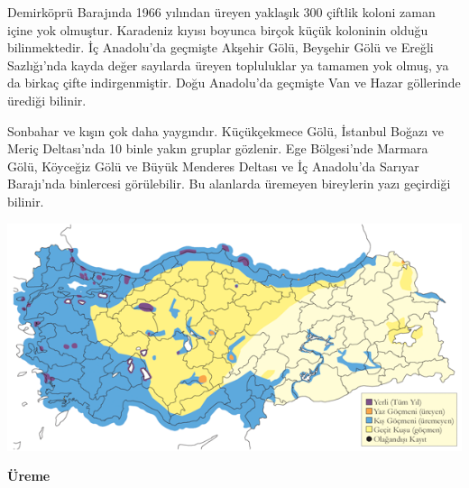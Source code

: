 \documentclass[
  letterpaper,
  DIV=11,
  numbers=noendperiod]{scrreprt}
\begin{document}
Demirköprü Barajında 1966 yılından üreyen yaklaşık 300 çiftlik koloni
zaman içine yok olmuştur. Karadeniz kıyısı boyunca birçok küçük
koloninin olduğu bilinmektedir. İç Anadolu'da geçmişte Akşehir Gölü,
Beyşehir Gölü ve Ereğli Sazlığı'nda kayda değer sayılarda üreyen
topluluklar ya tamamen yok olmuş, ya da birkaç çifte indirgenmiştir.
Doğu Anadolu'da geçmişte Van ve Hazar göllerinde ürediği bilinir.

Sonbahar ve kışın çok daha yaygındır. Küçükçekmece Gölü, İstanbul Boğazı
ve Meriç Deltası'nda 10 binle yakın gruplar gözlenir. Ege Bölgesi'nde
Marmara Gölü, Köyceğiz Gölü ve Büyük Menderes Deltası ve İç Anadolu'da
Sarıyar Barajı'nda binlercesi görülebilir. Bu alanlarda üremeyen
bireylerin yazı geçirdiği bilinir.

\includegraphics{images/harita_Page_079.png}

\textbf{Üreme}
\end{document}
